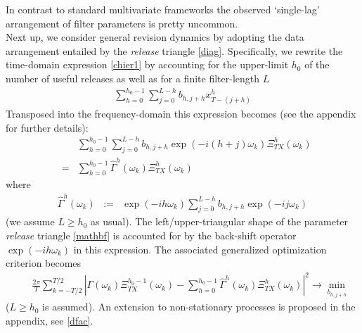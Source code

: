 \documentclass[11pt]{article}
\begin{document}
In contrast to standard multivariate frameworks the observed `single-lag' arrangement of filter parameters is pretty uncommon.\\



Next up, we consider general revision dynamics by adopting the data arrangement entailed by the \emph{release} triangle \ref{diag}. Specifically, we rewrite the time-domain expression \ref{chier1} by accounting for the upper-limit $h_0$ of the number of useful releases as well as for a finite filter-length $L$
\begin{eqnarray*}
\sum_{h=0}^{h_0-1}\sum_{j=0}^{L-h} b_{h,j+h}x_{T-(j+h)}^{h}
\end{eqnarray*}
Transposed into the frequency-domain this expression becomes (see the appendix for further details):
\begin{eqnarray}
&&\sum_{h=0}^{h_0-1}\sum_{j=0}^{L-h} b_{h,j+h}\exp(-i(h+j)\omega_k)\Xi_{TX}^{h}(\omega_k)\nonumber\\
&=&\sum_{h=0}^{h_0-1}
\hat{\Gamma}^h(\omega_k)\Xi_{TX}^{h}(\omega_k)
\end{eqnarray}
where
\begin{eqnarray}\label{vf}
\hat{\Gamma}^h(\omega_k)&:=&\exp(-ih\omega_k)\sum_{j=0}^{L-h} b_{h,j+h}\exp(-ij\omega_k)
\end{eqnarray}
(we assume $L\geq h_0$ as usual). The left/upper-triangular shape of the parameter \emph{release} triangle \ref{mathbf} is accounted for by the back-shift operator $\exp(-ih\omega_k)$ in this expression.
The associated generalized optimization criterion becomes
\begin{eqnarray}\label{dfavg}
&&\frac{2\pi}{T} \sum_{k=-T/2}^{T/2}
\left|\Gamma(\omega_k)\Xi_{TX}^{h_0-1}(\omega_k)-\sum_{h=0}^{h_0-1}\hat{\Gamma}^h(\omega_k)
\Xi_{TX}^{h}(\omega_k)\right|^2\to\min_{b_{h,j+h}}
\end{eqnarray}
($L\geq h_0$ is assumed). An extension to non-stationary processes is proposed in the appendix, see \ref{dfac}. \\
\end{document}
